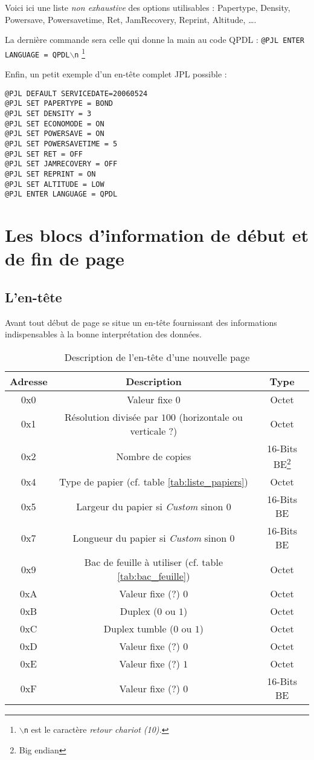 Voici ici une liste \emph{non exhaustive} des options utilisables :
Papertype, Density, Powersave, Powersavetime, Ret, JamRecovery, Reprint,
Altitude, \ldots.

La dernière commande sera celle qui donne la main au code QPDL : 
\texttt{@PJL ENTER LANGUAGE = QPDL$\backslash$n}
\footnote{\texttt{$\backslash$n} est le caractère \emph{retour chariot (10).}}
\medskip

Enfin, un petit exemple d'un en-tête complet JPL possible :
\begin{verbatim}
@PJL DEFAULT SERVICEDATE=20060524
@PJL SET PAPERTYPE = BOND
@PJL SET DENSITY = 3
@PJL SET ECONOMODE = ON
@PJL SET POWERSAVE = ON
@PJL SET POWERSAVETIME = 5
@PJL SET RET = OFF
@PJL SET JAMRECOVERY = OFF
@PJL SET REPRINT = ON
@PJL SET ALTITUDE = LOW
@PJL ENTER LANGUAGE = QPDL
\end{verbatim}




\section{Les blocs d'information de début et de fin de page}


\subsection{L'en-tête}
Avant tout début de page se situe un en-tête fournissant des informations
indispensables à la bonne interprétation des données.

\begin{table}[!ht]
\centering
\begin{tabular}{| c | c | c |}
\hline
\textbf{Adresse} & \textbf{Description} & \textbf{Type} \\
\hline
\hline
0x0 & Valeur fixe $0$ & Octet \\
0x1 & Résolution divisée par $100$ (horizontale ou verticale ?) & Octet \\
0x2 & Nombre de copies & 16-Bits BE\footnote{Big endian} \\
0x4 & Type de papier (cf. table \ref{tab:liste_papiers}) & Octet \\
0x5 & Largeur du papier si \emph{Custom} sinon $0$ & 16-Bits BE \\
0x7 & Longueur du papier si \emph{Custom} sinon $0$ & 16-Bits BE \\
0x9 & Bac de feuille à utiliser (cf. table \ref{tab:bac_feuille}) & Octet \\
0xA & Valeur fixe (?) $0$ & Octet \\
0xB & Duplex ($0$ ou $1$) & Octet \\
0xC & Duplex tumble ($0$ ou $1$) & Octet \\
0xD & Valeur fixe (?) $0$ & Octet \\
0xE & Valeur fixe (?) $1$ & Octet \\
0xF & Valeur fixe (?) $0$ & 16-Bits BE\\
\hline
\end{tabular}
\caption{Description de l'en-tête d'une nouvelle page}
\label{tab:entete_page}
\end{table}

